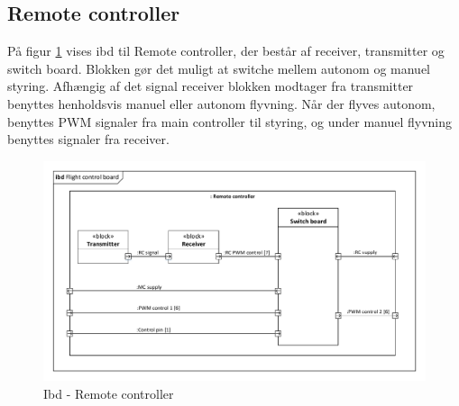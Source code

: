 \subsection{Remote controller}

På figur \ref{fig:ibd_remotecontroller} vises ibd til Remote controller, der består af receiver, transmitter og switch board. Blokken gør det muligt at switche mellem autonom og manuel styring. Afhængig af det signal receiver blokken modtager fra transmitter benyttes henholdsvis manuel eller autonom flyvning. Når der flyves autonom, benyttes PWM signaler fra main controller til styring, og under manuel flyvning benyttes signaler fra receiver.

\begin{figure}[H]
\centering
\includegraphics[width=1\textwidth]{Billeder/IBD/ibd7_remotecontroller.pdf}
\vspace{-1cm}
\caption{Ibd - Remote controller}
\label{fig:ibd_remotecontroller}
\end{figure}

